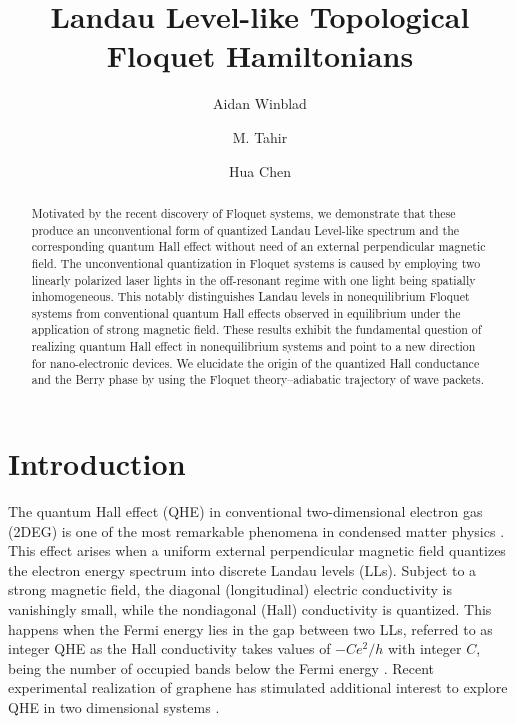 \documentclass[aps,prb,twocolumn,showpacs,superscriptaddress]{revtex4-2}
\begin{document}
\title{Landau Level-like Topological Floquet Hamiltonians}

\author{Aidan Winblad}

\author{M. Tahir}

\author{Hua Chen}

\begin{abstract}
Motivated by the recent discovery of Floquet systems, we demonstrate that these produce an unconventional form of quantized Landau Level-like spectrum and the corresponding quantum Hall effect without need of an external perpendicular magnetic field.
The unconventional quantization in Floquet systems is caused by employing two linearly polarized laser lights in the off-resonant regime with one light being spatially inhomogeneous.
This notably distinguishes Landau levels in nonequilibrium Floquet systems from conventional quantum Hall effects observed in equilibrium under the application of strong magnetic field.
These results exhibit the fundamental question of realizing quantum Hall effect in nonequilibrium systems and point to a new direction for nano-electronic devices.
We elucidate the origin of the quantized Hall conductance and the Berry phase by using the Floquet theory--adiabatic trajectory of wave packets.
\end{abstract}

\maketitle

\section{Introduction}

The quantum Hall effect (QHE) in conventional two-dimensional electron gas (2DEG) is one of the most remarkable phenomena in condensed matter physics \cite{QHE1}.
This effect arises when a uniform external perpendicular magnetic field quantizes the electron energy spectrum into discrete Landau levels (LLs).
Subject to a strong magnetic field, the diagonal (longitudinal) electric conductivity is vanishingly small, while the nondiagonal (Hall) conductivity is quantized.
This happens when the Fermi energy lies in the gap between two LLs, referred to as integer QHE as the Hall conductivity takes values of $-Ce^2/h$ with integer $C$, being the number of occupied bands below the Fermi energy \cite{QHE4}.
Recent experimental realization of graphene has stimulated additional interest to explore QHE in two dimensional systems \cite{QHE2, QHE3, QHE4}.
\end{document}
